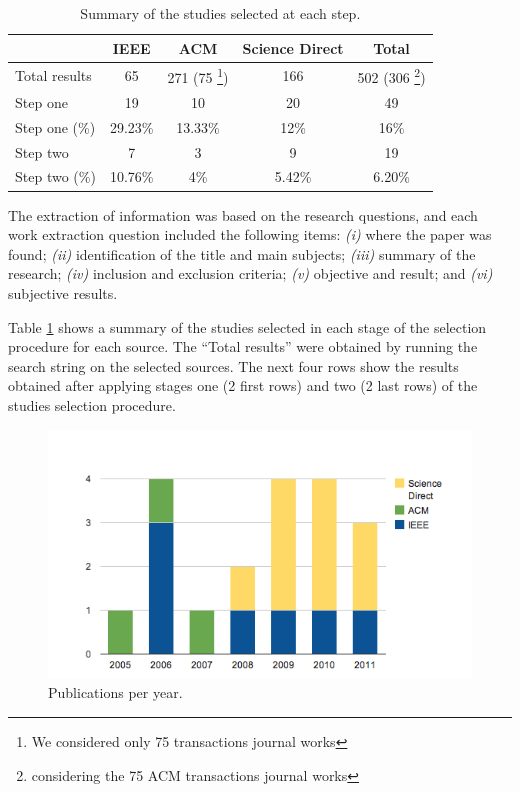 \documentclass{sig-alternate}
\begin{document}
\begin{table}[ht!]
\tiny
\begin{tabular}{l|c|c|c|c}
  \hline
  \hline
   & IEEE & ACM  & Science Direct & Total \\
  \hline
  \hline
  Total results & 65 & 271 (75 \footnote{We considered only 75 transactions
  journal works}) & 166 & 502 (306 \footnote{considering the 75 ACM
  transactions journal works}) \\
  \hline
  Step one  & 19 & 10 & 20  & 49 \\
  Step one (\%) & 29.23\% & 13.33\% & 12\% &
  16\% \\
  \hline
  Step two & 7 & 3 & 9 & 19\\
  Step two (\%)  & 10.76\% & 4\% & 5.42\% & 6.20\%\\
  \hline
  \hline
\end{tabular}
\caption{Summary of the studies selected at each step.}
\label{tab:result01}
\end{table}


The extraction of information was based on the research questions, and each work extraction question included the following
items: \textit{(i)} where the paper was found; \textit{(ii)} identification of the title and main
subjects; \textit{(iii)} summary of the research; \textit{(iv)} inclusion and
exclusion criteria; \textit{(v)} objective and result; and \textit{(vi)}
subjective results. 


Table \ref{tab:result01} shows a summary of the studies selected in each stage
of the selection procedure for each source. The ``Total results'' were obtained
by running the search string on the selected sources. The next four rows show
the results obtained after applying stages one (2 first rows) and two (2 last
rows) of the studies selection procedure.


\begin{figure}
\centering
\includegraphics[width=.49\textwidth]{figs/data.png}
\caption{Publications per year.}
\label{fig:statistics}
\end{figure}
\end{document}
